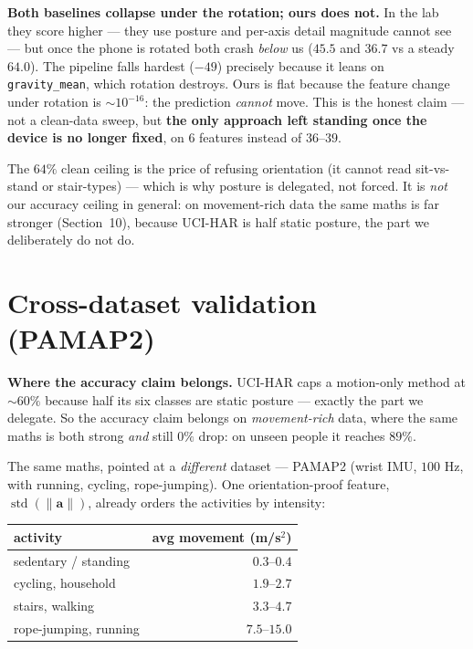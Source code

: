 \documentclass[11pt]{article}
\begin{document}
\textbf{Both baselines collapse under the rotation; ours does not.} In the lab they score
higher --- they use posture and per-axis detail magnitude cannot see --- but once the phone
is rotated both crash \emph{below} us ($45.5$ and $36.7$ vs a steady $64.0$). The pipeline
falls hardest ($-49$) precisely because it leans on \texttt{gravity\_mean}, which rotation
destroys. Ours is flat because the feature change under rotation is
$\sim\!10^{-16}$: the prediction \emph{cannot} move. This is the honest claim --- not a
clean-data sweep, but \textbf{the only approach left standing once the device is no longer
fixed}, on $6$ features instead of $36$--$39$.

The $64\%$ clean ceiling is the price of refusing orientation (it cannot read sit-vs-stand
or stair-types) --- which is why posture is delegated, not forced. It is \emph{not} our
accuracy ceiling in general: on movement-rich data the same maths is far stronger
(Section~10), because UCI-HAR is half static posture, the part we deliberately do not do.

\section{Cross-dataset validation (PAMAP2)}

\textbf{Where the accuracy claim belongs.} UCI-HAR caps a motion-only method at
$\sim\!60\%$ because half its six classes are static posture --- exactly the part we
delegate. So the accuracy claim belongs on \emph{movement-rich} data, where the same maths
is both strong \emph{and} still $0\%$ drop: on unseen people it reaches \textbf{$89\%$}.

The same maths, pointed at a \emph{different} dataset --- PAMAP2 (wrist IMU, $100$ Hz,
with running, cycling, rope-jumping). One orientation-proof feature,
$\operatorname{std}(\lVert\mathbf a\rVert)$, already orders the activities by intensity:
\begin{center}
\begin{tabular}{lr}
activity & avg movement (m/s$^2$)\\ \hline
sedentary / standing  & $0.3$--$0.4$\\
cycling, household    & $1.9$--$2.7$\\
stairs, walking       & $3.3$--$4.7$\\
rope-jumping, running & $7.5$--$15.0$\\
\end{tabular}
\end{center}
\end{document}
